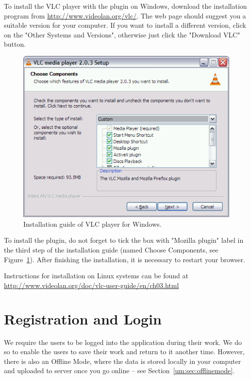 To install the VLC player with the plugin on Windows, download the installation program from \url{http://www.videolan.org/vlc/}. The web page should suggest you a suitable version for your computer. If you want to install a different version, click on the "Other Systems and Versions", otherwise just click the "Download VLC" button.

\begin{figure}[h]
\begin{center}
\includegraphics[scale=0.4]{figures/vlc_installation.png}
\end{center}
\caption{Installation guide of VLC player for Windows.}
\label{fig:vlc}
\end{figure}

To install the plugin, do not forget to tick the box with "Mozilla plugin" label in the third step of the installation guide (named Choose Components, see Figure~\ref{fig:vlc}). After finishing the installation, it is necessary to restart your browser.

Instructions for installation on Linux systems can be found at \url{http://www.videolan.org/doc/vlc-user-guide/en/ch03.html}


\section{Registration and Login}
\label{um:sec:login}

We require the users to be logged into the application during their work. We do so to enable the users to save their work and return to it another time. However, there is also an Offline Mode, where the data is stored locally in your computer and uploaded to server once you go online -- see Section~\ref{um:sec:offlinemode}.


